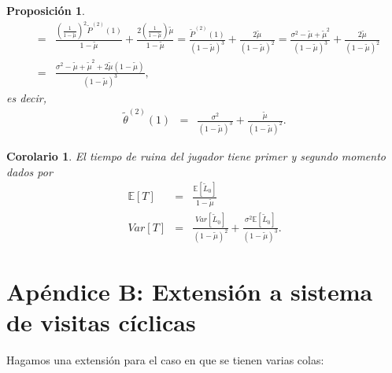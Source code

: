 \documentclass{article}
\newtheorem{Prop}{Proposición}[section]
\newtheorem{Cor}{Corolario}[section]
\newcommand{\esp}{\mathbb{E}}
\numberwithin{equation}{section}
\begin{document}
\begin{Prop}
\begin{eqnarray*}
&=&\frac{\left(\frac{1}{1-\tilde{\mu}}\right)^{2}\tilde{P}^{(2)}\left(1\right)}{1-\tilde{\mu}}+\frac{2\left(\frac{1}{1-\tilde{\mu}}\right)\tilde{\mu}}{1-\tilde{\mu}}=\frac{\tilde{P}^{(2)}\left(1\right)}{\left(1-\tilde{\mu}\right)^{3}}+\frac{2\tilde{\mu}}{\left(1-\tilde{\mu}\right)^{2}}=\frac{\sigma^{2}-\tilde{\mu}+\tilde{\mu}^{2}}{\left(1-\tilde{\mu}\right)^{3}}+\frac{2\tilde{\mu}}{\left(1-\tilde{\mu}\right)^{2}}\\
&=&\frac{\sigma^{2}-\tilde{\mu}+\tilde{\mu}^{2}+2\tilde{\mu}\left(1-\tilde{\mu}\right)}{\left(1-\tilde{\mu}\right)^{3}},
\end{eqnarray*}
es decir,
\begin{eqnarray*}
\tilde{\theta}^{(2)}\left(1\right)&=&\frac{\sigma^{2}}{\left(1-\tilde{\mu}\right)^{3}}+\frac{\tilde{\mu}}{\left(1-\tilde{\mu}\right)^{2}}.
\end{eqnarray*}
\end{Prop}

\begin{Cor}
El tiempo de ruina del jugador tiene primer y segundo momento dados por
\begin{eqnarray}
\esp\left[T\right]&=&\frac{\esp\left[\tilde{L}_{0}\right]}{1-\tilde{\mu}}\\
Var\left[T\right]&=&\frac{Var\left[\tilde{L}_{0}\right]}{\left(1-\tilde{\mu}\right)^{2}}+\frac{\sigma^{2}\esp\left[\tilde{L}_{0}\right]}{\left(1-\tilde{\mu}\right)^{3}}.
\end{eqnarray}
\end{Cor}

\section*{Ap\'endice B: Extensi\'on a sistema de visitas c\'iclicas}
Hagamos una extensi\'on para el caso en que se tienen varias colas:
\end{document}
